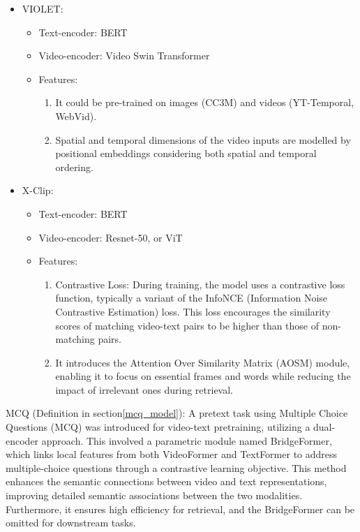 \begin{itemize}
\item 	VIOLET:
\begin{itemize}
\item Text-encoder: BERT
\item Video-encoder: Video Swin Transformer
\item Features:
\begin{enumerate}
\item It could be pre-trained on images (CC3M) and videos (YT-Temporal, WebVid).
\item Spatial and temporal dimensions of the video inputs are modelled by positional embeddings considering both spatial and temporal ordering. 
\end{enumerate}
\end{itemize}
\end{itemize}
\newpage
\begin{itemize}
\item 	X-Clip:
\begin{itemize}
\item Text-encoder: BERT
\item Video-encoder: Resnet-50, or ViT
\item Features:
\begin{enumerate}
\item Contrastive Loss: During training, the model uses a contrastive loss function, typically a variant of the InfoNCE (Information Noise Contrastive Estimation) loss. This loss encourages the similarity scores of matching video-text pairs to be higher than those of non-matching pairs.
\item It introduces the Attention Over Similarity Matrix (AOSM) module, enabling it to focus on essential frames and words while reducing the impact of irrelevant ones during retrieval.
\end{enumerate}
\end{itemize}
\end{itemize}

MCQ (Definition in section\ref{mcq_model}): A pretext task using Multiple Choice Questions (MCQ) was introduced for video-text pretraining, utilizing a dual-encoder approach. This involved a parametric module named BridgeFormer, which links local features from both VideoFormer and TextFormer to address multiple-choice questions through a contrastive learning objective. This method enhances the semantic connections between video and text representations, improving detailed semantic associations between the two modalities. Furthermore, it ensures high efficiency for retrieval, and the BridgeFormer can be omitted for downstream tasks.

